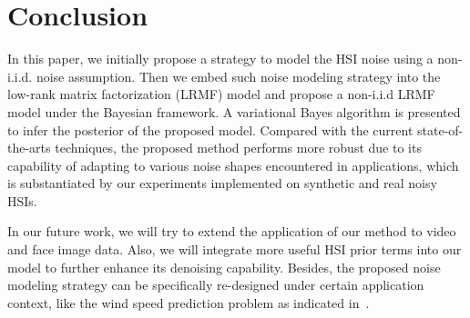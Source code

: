 \documentclass[journal]{IEEEtran}
\begin{document}
\section{Conclusion}
In this paper, we initially propose a strategy to model the HSI noise using a non-i.i.d. noise assumption. Then we embed such noise modeling strategy into the low-rank matrix factorization (LRMF) model and propose a non-i.i.d LRMF model under the Bayesian framework. A variational Bayes algorithm
is presented to infer the posterior of the proposed model.
Compared with the current state-of-the-arts techniques, the
proposed method performs more robust due to its capability of
adapting to various noise shapes encountered in applications,
which is substantiated by our experiments implemented on
synthetic and real noisy HSIs.

In our future work, we will try to extend the application of our method to video and face image data. Also, we will integrate more useful HSI prior terms into our model to further enhance its denoising capability. Besides, the proposed noise modeling strategy can be specifically re-designed under certain application context, like the wind speed prediction problem as indicated in~\cite{hu2014noise,hu2016estimating}.


\ifCLASSOPTIONcaptionsoff
  \newpage
\fi















\end{document}
